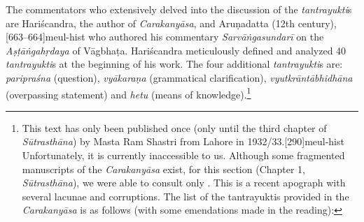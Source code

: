 The commentators who extensively delved into the discussion of the \emph{tantrayukti}s are Hariścandra, the author of \emph{Carakanyāsa}, and Aruṇadatta (12th century),[663--664]{meul-hist}
who authored his commentary \emph{Sarvāṅgasundarī} on the \emph{Aṣṭāṅgahṛdaya} of Vāgbhaṭa. Hariścandra meticulously defined and analyzed 40 \emph{tantrayukti}s at the beginning of his work. The four additional \emph{tantrayukti}s are:  \emph{paripraśna} (question), \emph{vyākaraṇa} (grammatical clarification), \emph{vyutkrāntābhidhāna} (overpassing statement) and \emph{hetu} (means of knowledge).\footnote{This text has only been published once 
	(only until the third chapter of \emph{Sūtrasthāna}) by Masta Ram Shastri from Lahore in 1932/33.[290]{meul-hist} Unfortunately, it is currently inaccessible to us. Although some fragmented manuscripts of the \emph{Carakanyāsa} exist, for this section (Chapter 1, \emph{Sūtrasthāna}), we were able to consult only . This is a recent apograph with several lacunae and corruptions. The list of the tantrayuktis provided in the \emph{Carakanyāsa} is as follows (with some emendations made in the reading): }

